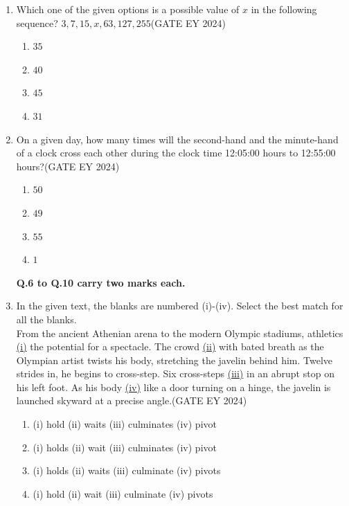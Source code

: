 \begin{enumerate}
\item Which one of the given options is a possible value of $x$ in the following sequence? $3, 7, 15, x, 63, 127, 255$\hfill{(GATE EY 2024)}
\begin{multicols}{2}
\begin{enumerate}
\item $35$
\item $40$
\item $45$
\item $31$
\end{enumerate}
\end{multicols}


\item On a given day, how many times will the second-hand and the minute-hand of a clock cross each other during the clock time 12:05:00 hours to 12:55:00 hours?\hfill{(GATE EY 2024)}
\begin{multicols}{2}
\begin{enumerate}
\item $50$
\item $49$
\item $55$
\item $1$
\end{enumerate}
\end{multicols}

\textbf{Q.6 to Q.10 carry two marks each.}

\item In the given text, the blanks are numbered (i)-(iv). Select the best match for all the blanks. \\
From the ancient Athenian arena to the modern Olympic stadiums, athletics \underline{\hspace{0.5cm}(i)\hspace{0.5cm}} the potential for a spectacle. The crowd \underline{\hspace{0.5cm}(ii)\hspace{0.5cm}} with bated breath as the Olympian artist twists his body, stretching the javelin behind him. Twelve strides in, he begins to cross-step. Six cross-steps \underline{\hspace{0.5cm}(iii)\hspace{0.5cm}} in an abrupt stop on his left foot. As his body \underline{\hspace{0.5cm}(iv)\hspace{0.5cm}} like a door turning on a hinge, the javelin is launched skyward at a precise angle.\hfill{(GATE EY 2024)}
\begin{enumerate}
\item (i) hold (ii) waits (iii) culminates (iv) pivot
\item (i) holds (ii) wait (iii) culminates (iv) pivot
\item (i) holds (ii) waits (iii) culminate (iv) pivots
\item (i) hold (ii) wait (iii) culminate (iv) pivots
\end{enumerate}


\end{enumerate}
